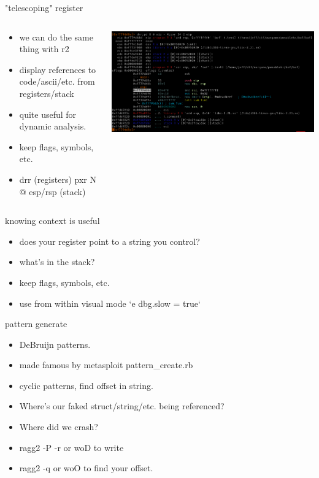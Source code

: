\documentclass[10pt,pdf,utf8,english,compress,hyperref={unicode}]{beamer}
\begin{document}
\begin{frame}{"telescoping" register}
	\begin{columns}
		\begin{column}{.3\textwidth}
			\begin{itemize}
				\item we can do the same thing with r2
				\item display references to code/ascii/etc. from registers/stack
				\item quite useful for dynamic analysis.
				\item keep flags, symbols, etc.
				\item drr (registers) pxr N @ esp/rsp (stack)
			\end{itemize}
		\end{column}
		\begin{column}{.7\textwidth}
			\includegraphics[width=\textwidth]{crimages/r2_context1.png}
		\end{column}
	\end{columns}
\end{frame}

\begin{frame}{knowing context is useful}
	\begin{itemize}
		\item does your register point to a string you control?
		\item what's in the stack?
		\item keep flags, symbols, etc.
		\item use from within visual mode `e dbg.slow = true`
	\end{itemize}
\end{frame}

\begin{frame}{pattern generate}
	\begin{itemize}
		\item DeBruijn patterns.
		\item made famous by metasploit pattern\_create.rb
		\item cyclic patterns, find offset in string.
		\item Where's our faked struct/string/etc. being referenced?
		\item Where did we crash?
		\item ragg2 -P -r or woD to write
		\item ragg2 -q or woO to find your offset.
	\end{itemize}
\end{frame}
\end{document}
